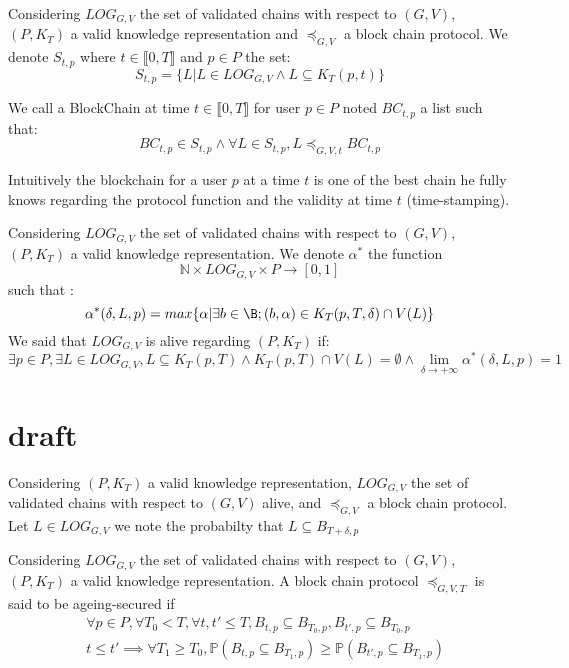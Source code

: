 \begin{mydef}
	Considering $LOG_{G,V}$ the set of validated chains with respect to $(G,V)$, $(P,K_T)$ a valid knowledge representation and $\preceq_{G,V}$ a block chain protocol. We denote $S_{t,p}$ where $t\in \llbracket0,T\rrbracket$ and $p\in P$ the set:
	$$ S_{t,p} = \{L | L \in LOG_{G,V} \land  L \subseteq K_T(p,t)\} $$
	
	We call a BlockChain at time $t\in \llbracket0,T\rrbracket$ for user $p \in P$ noted $BC_{t,p}$ a list such that:
	$$BC_{t,p} \in S_{t,p} \land \forall L \in S_{t,p}, L \preceq_{G,V,t} BC_{t,p} $$
	
\end{mydef}
\begin{myrem}
	Intuitively the blockchain for a user $p$ at a time $t$ is one of the best chain he fully knows regarding the protocol function and the validity at time $t$ (time-stamping).
\end{myrem}

\begin{mydef}
	Considering $LOG_{G,V}$ the set of validated chains with respect to $(G,V)$, $(P,K_T)$ a valid knowledge representation.
	We denote $\alpha^*$ the function $$ \mathbb{N} \times LOG_{G,V} \times P \rightarrow [0,1]$$ such that : 
	$$\alpha^*(\delta,L,p) = max\{\alpha | \exists b \in \B; (b,\alpha) \in K_T(p,T,\delta)\cap V(L)\} $$
	We said that $LOG_{G,V}$ is alive regarding $(P,K_T)$ if:
	$$\exists p \in P, \exists L \in LOG_{G,V}, L \subseteq K_T(p,T) \land K_T(p,T) \cap V(L) = \emptyset \land \lim\limits_{\delta\rightarrow +\infty} \alpha^*(\delta,L,p) = 1$$
\end{mydef}




\section{draft}
	
	\begin{mydef}
		Considering $(P,K_T)$ a valid knowledge representation, $LOG_{G,V}$ the set of validated chains with respect to $(G,V)$ alive, and $\preceq_{G,V}$ a block chain protocol. Let $L \in LOG_{G,V}$ we note 
		the probabilty that $L \subseteq B_{T+\delta,p}$  
	\end{mydef}
	
	
\begin{mydef}
	Considering $LOG_{G,V}$ the set of validated chains with respect to $(G,V)$, $(P,K_T)$ a valid knowledge representation. A block chain protocol $\preceq_{G,V,T}$ is said to be ageing-secured if
	\begin{eqnarray*}
		&\forall p \in P,\forall T_0 < T, \forall t,t' \leq T, B_{t,p} \subseteq B_{T_0,p}, B_{t',p} \subseteq B_{T_0,p} \\
		&t\leq t' \implies \forall T_1\geq T_0 , \mathbb{P}(B_{t,p}\subseteq B_{T_1,p}) \geq \mathbb{P}(B_{t',p}\subseteq B_{T_1,p})
	\end{eqnarray*}
\end{mydef}

